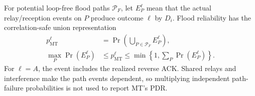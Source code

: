\documentclass[conference,letterpaper,10pt]{IEEEtran}
\begin{document}
For potential loop-free flood paths $\mathcal P_F$, let $E_P^\ell$ mean that
the actual relay/reception events on $P$ produce outcome $\ell$ by $D_i$.
Flood reliability has the correlation-safe union representation
\begin{equation}
\begin{aligned}
p_{\mathrm{MT}}^\ell&=\Pr\!\left(\bigcup_{P\in\mathcal P_F}E_P^\ell\right),\\
\max_P\Pr(E_P^\ell)&\leq p_{\mathrm{MT}}^\ell
 \leq\min\!\left\{1,\sum_P\Pr(E_P^\ell)\right\}.
\end{aligned}
\label{eq:meshtastic-reliability}
\end{equation}
For $\ell=A$, the event includes the realized reverse ACK.
Shared relays and interference make the path events dependent, so multiplying
independent path-failure probabilities is not used to report MT's PDR.
\end{document}
